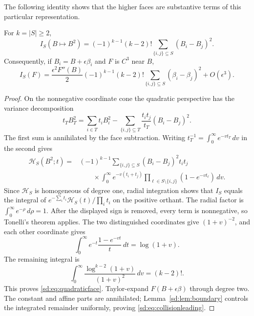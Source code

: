The following identity shows that the higher faces are substantive
terms of this particular representation.

\begin{proposition}
\label{sd:prop:quadraticface}
For $k=|S|\ge2$,
\begin{equation}\label{sd:eq:quadraticface}
 \boxed{\displaystyle
 I_S(B\mapsto B^2)=(-1)^{k-1}(k-2)!
                             \sum_{\{i,j\}\subseteq S}(B_i-B_j)^2.}
\end{equation}
Consequently, if $B_i=B+\epsilon\beta_i$ and $F$ is $C^3$ near $B$,
\begin{equation}\label{sd:eq:collisionleading}
 I_S(F)=\frac{\epsilon^2F''(B)}2(-1)^{k-1}(k-2)!
           \sum_{\{i,j\}\subseteq S}(\beta_i-\beta_j)^2
                         +O(\epsilon^3).
\end{equation}
\end{proposition}
\begin{proof}
On the nonnegative coordinate cone the quadratic perspective has the
variance decomposition
\[
 t_T B_T^2=\sum_{i\in T}t_iB_i^2
       -\sum_{\{i,j\}\subseteq T}
                 \frac{t_it_j}{t_T}(B_i-B_j)^2.
\]
The first sum is annihilated by the face subtraction.  Writing
$t_T^{-1}=\int_0^\infty e^{-vt_T}\,dv$ in the second gives
\begin{align*}
 \mathcal H_S(B^2;t)
  ={}&(-1)^{k-1}\sum_{\{i,j\}\subseteq S}(B_i-B_j)^2t_it_j\\
 &\qquad\times\int_0^\infty e^{-v(t_i+t_j)}
                 \prod_{\ell\in S\setminus\{i,j\}}
                         (1-e^{-vt_\ell})\,dv.
\end{align*}
Since $\mathcal H_S$ is homogeneous of degree one, radial integration
shows that $I_S$ equals the integral of
$e^{-\sum_i t_i}\mathcal H_S(t)/\prod_i t_i$ on the positive
orthant.  The radial factor is $\int_0^\infty e^{-\rho}\,d\rho=1$.
After the displayed sign is removed, every term is nonnegative, so
Tonelli's theorem applies.  The two distinguished coordinates give
$(1+v)^{-2}$, and each other coordinate gives
\[
 \int_0^\infty e^{-t}\frac{1-e^{-vt}}{t}\,dt=\log(1+v).
\]
The remaining integral is
\[
 \int_0^\infty\frac{\log^{k-2}(1+v)}{(1+v)^2}\,dv=(k-2)!.
\]
This proves \eqref{sd:eq:quadraticface}.  Taylor-expand $F(B+\epsilon
\beta)$ through degree two.  The constant and affine parts are
annihilated; Lemma~\ref{sd:lem:boundary} controls the integrated
remainder uniformly, proving \eqref{sd:eq:collisionleading}.
\end{proof}

